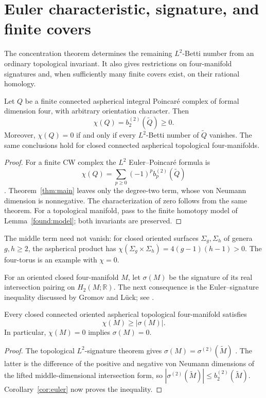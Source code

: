 \section{Euler characteristic, signature, and finite covers}
\label{sec:consequences}

The concentration theorem determines the remaining $L^2$-Betti number
from an ordinary topological invariant. It also gives restrictions on
four-manifold signatures and, when sufficiently many finite covers
exist, on their rational homology.

\begin{corollary}\label{cor:euler}
Let $Q$ be a finite connected aspherical integral Poincar\'e complex
of formal dimension four, with arbitrary orientation character. Then
\[
 \chi(Q)=b_2^{(2)}(\widetilde Q)\ge0.
\]
Moreover, $\chi(Q)=0$ if and only if every $L^2$-Betti number of
$\widetilde Q$ vanishes. The same conclusions hold for closed connected
aspherical topological four-manifolds.
\end{corollary}
\begin{proof}
For a finite CW complex the $L^2$ Euler--Poincar\'e formula is
\[
 \chi(Q)=\sum_{p\ge0}(-1)^p b_p^{(2)}(\widetilde Q)
\]
\cite[Theorem~1.35(2)]{Luck2002}. Theorem~\ref{thm:main} leaves only
the degree-two term, whose von Neumann dimension is nonnegative.
The characterization of zero follows from the same theorem.
For a topological manifold, pass to the finite homotopy model of
Lemma~\ref{found:model}; both invariants are preserved.
\end{proof}

The middle term need not vanish: for closed oriented surfaces
$\Sigma_g,\Sigma_h$ of genera $g,h\ge2$, the aspherical product has
$\chi(\Sigma_g\times\Sigma_h)=4(g-1)(h-1)>0$.
The four-torus is an example with $\chi=0$.

For an oriented closed four-manifold $M$, let $\sigma(M)$ be the
signature of its real intersection pairing on $H_2(M;\mathbb R)$.
The next consequence is the Euler--signature inequality discussed by
Gromov and L\"uck; see \cite[Conjecture~1.3]{AlbaneseDiCerboLombardi2025}.

\begin{corollary}\label{cor:signature}
Every closed connected oriented aspherical topological four-manifold
satisfies
\[
 \chi(M)\ge |\sigma(M)|.
\]
In particular, $\chi(M)=0$ implies $\sigma(M)=0$.
\end{corollary}
\begin{proof}
The topological $L^2$-signature theorem gives
$\sigma(M)=\sigma^{(2)}(\widetilde M)$
\cite[Theorem~0.2]{LuckSchick2003}.
The latter is the difference of the positive and negative von Neumann
dimensions of the lifted middle-dimensional intersection form, so
$|\sigma^{(2)}(\widetilde M)|\le b_2^{(2)}(\widetilde M)$.
Corollary~\ref{cor:euler} now proves the inequality.
\end{proof}

